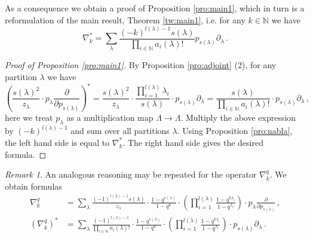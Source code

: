 \documentclass[12pt,a4paper]{amsart}
\theoremstyle{plain}
\theoremstyle{definition}
\theoremstyle{remark}
\newtheorem{rem}[tw]{Remark}
\newcommand{\NN}{\mathbb{N}}
\begin{document}
As a consequence we obtain a proof of Proposition \ref{pro:main1}, which in turn is a reformulation of the main result, Theorem \ref{tw:main1}, i.e. for any $k\in \NN$ we have
$$
\nabla_k^*=\sum_{\lambda}\frac{(-k)^{l(\lambda)-1}s(\lambda)}{\prod_{i\in\NN} a_i(\lambda)!} p_{s(\lambda)}\partial_{\lambda}\,.
$$
\begin{proof}[Proof of Proposition \ref{pro:main1}]
	By Proposition \ref{pro:adjoint} (2), for any partition $\lambda$ we have
	$$
	\left(\frac{s(\lambda)^2}{z_\lambda} \cdot p_{\lambda}\frac{\partial}{\partial p_{s(\lambda)}}\right)^*=
	\frac{s(\lambda)^2}{z_\lambda} \cdot \frac{\prod_{i=1}^{l(\lambda)}\lambda_i}{s(\lambda)}\cdot p_{s(\lambda)}\partial_{\lambda}=
	\frac{s(\lambda)}{\prod_{i\in\NN} a_i(\lambda)!} \cdot  p_{s(\lambda)}\partial_{\lambda}\,,
	$$
	here we treat $p_\lambda$ as a multiplication map $\Lambda \to \Lambda$. Multiply the above expression by $(-k)^{l(\lambda)-1}$ and sum over all partitions $\lambda$. Using Proposition \ref{pro:nabla}, the left hand side is equal to $\nabla_k^*$. The right hand side gives the desired formula.
\end{proof}

\begin{rem}
	An analogous reasoning may be repeated for the operator $\nabla^q_k$. We obtain formulas
	\begin{align*}
	\nabla^q_k&=\sum_{\lambda} \frac{(-1)^{l(\lambda)-1}s(\lambda)}{z_\lambda}
	\cdot \frac{1-q^{s(\lambda)}}{1-q^{k}}\cdot \left(\prod_{i=1}^{l(\lambda)}\frac{1-q^{k\lambda_i}}{1-q^{\lambda_i}}\right)
	\cdot
	p_{\lambda}\frac{\partial}{\partial p_{s(\lambda)}}\,,
	\\
	(\nabla^q_k)^*&=\sum_{\lambda} \frac{(-1)^{l(\lambda)-1}}{\prod_{i\in\NN} a_i(\lambda)!}
	\cdot \frac{1-q^{s(\lambda)}}{1-q^{k}}\cdot \left(\prod_{i=1}^{l(\lambda)}\frac{1-q^{k\lambda_i}}{1-q^{\lambda_i}}\right)
	\cdot p_{s(\lambda)}\partial_{\lambda}\,.
	\end{align*}
\end{rem}
\end{document}
